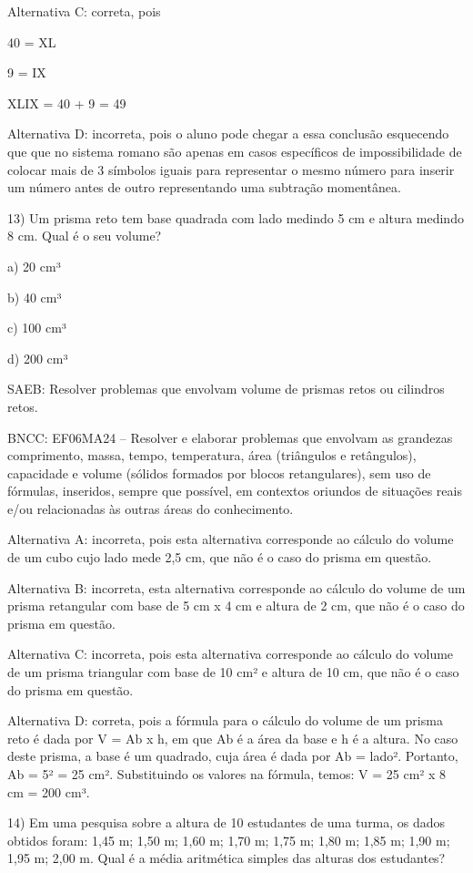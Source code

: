 Alternativa C: correta, pois

40 = XL

9 = IX

XLIX = 40 + 9 = 49

Alternativa D: incorreta, pois o aluno pode chegar a essa conclusão
esquecendo que que no sistema romano são apenas em casos específicos de
impossibilidade de colocar mais de 3 símbolos iguais para representar o
mesmo número para inserir um número antes de outro representando uma
subtração momentânea.

13) Um prisma reto tem base quadrada com lado medindo 5 cm e altura
medindo 8 cm. Qual é o seu volume?

a) 20 cm³

b) 40 cm³

c) 100 cm³

d) 200 cm³

SAEB: Resolver problemas que envolvam volume de prismas retos ou
cilindros retos.

BNCC: EF06MA24 -- Resolver e elaborar problemas que envolvam as
grandezas comprimento, massa, tempo, temperatura, área (triângulos e
retângulos), capacidade e volume (sólidos formados por blocos
retangulares), sem uso de fórmulas, inseridos, sempre que possível, em
contextos oriundos de situações reais e/ou relacionadas às outras áreas
do conhecimento.

Alternativa A: incorreta, pois esta alternativa corresponde ao cálculo
do volume de um cubo cujo lado mede 2,5 cm, que não é o caso do prisma
em questão.

Alternativa B: incorreta, esta alternativa corresponde ao cálculo do
volume de um prisma retangular com base de 5 cm x 4 cm e altura de 2 cm,
que não é o caso do prisma em questão.

Alternativa C: incorreta, pois esta alternativa corresponde ao cálculo
do volume de um prisma triangular com base de 10 cm² e altura de 10 cm,
que não é o caso do prisma em questão.

Alternativa D: correta, pois a fórmula para o cálculo do volume de um
prisma reto é dada por V = Ab x h, em que Ab é a área da base e h é a
altura. No caso deste prisma, a base é um quadrado, cuja área é dada por
Ab = lado². Portanto, Ab = 5² = 25 cm². Substituindo os valores na
fórmula, temos: V = 25 cm² x 8 cm = 200 cm³.

14) Em uma pesquisa sobre a altura de 10 estudantes de uma turma, os
dados obtidos foram: 1,45 m; 1,50 m; 1,60 m; 1,70 m; 1,75 m; 1,80 m;
1,85 m; 1,90 m; 1,95 m; 2,00 m. Qual é a média aritmética simples das
alturas dos estudantes?

